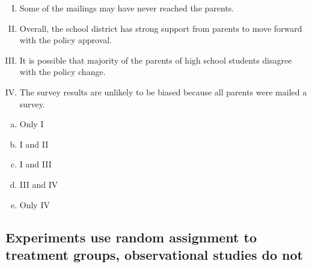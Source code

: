 \documentclass[11pt,containsverbatim,handout,xcolor=xelatex,dvipsnames,table]{beamer}
\newcommand{\solnMult}[1]{#1}
\begin{document}
\begin{frame}[shrink]

{\small
{}

\begin{enumerate}[I.]
\item Some of the mailings may have never reached the parents.
\item Overall, the school district has strong support from parents to move forward with the policy approval.
\item It is possible that majority of the parents of high school students disagree with the policy change.
\item The survey results are unlikely to be biased because all parents were mailed a survey. 
\end{enumerate}

\begin{multicols}{5}
\begin{enumerate}[(a)]
\item Only I
\item I and II
\item \solnMult{I and III}
\item III and IV
\item Only IV
\end{enumerate}
\end{multicols}
}

\end{frame}


\subsection{Experiments use random assignment to treatment groups, observational studies do not}
\label{mi4}

\end{document}
